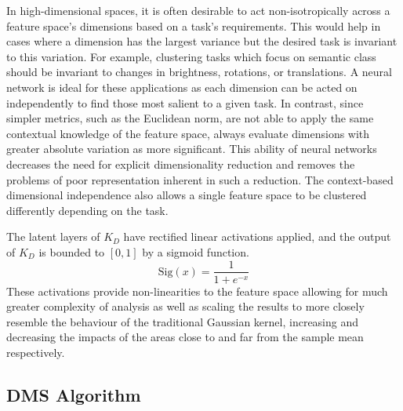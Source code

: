 \documentclass[../thesis.tex]{subfiles}
\begin{document}
In high-dimensional spaces,  it is often desirable to act non-isotropically across a feature space's dimensions based on a task's requirements. This would help in cases where a dimension has the largest variance but the desired task is invariant to this variation. For example, clustering tasks which focus on semantic class should be invariant to changes in brightness, rotations, or translations. 
A neural network is ideal for these applications as each dimension can be acted on independently to find those most salient to a given task. 
In contrast, since simpler metrics, such as the Euclidean norm, are not able to apply the same contextual knowledge of the feature space, always evaluate dimensions with greater absolute variation as more significant.
This ability of neural networks decreases the need for explicit dimensionality reduction and removes the problems of poor representation inherent in such a reduction.
The context-based dimensional independence also allows a single feature space to be clustered differently depending on the task.



The latent layers of $K_D$ have rectified linear activations applied, and the output of $K_D$ is bounded to $[0,1]$ by a sigmoid function.
\begin{equation}
    \mathrm{Sig}(x)= \frac {1}{1+e^{-x}}
\end{equation}
These activations provide non-linearities to the feature space allowing for much greater complexity of analysis as well as scaling the results to more closely resemble the behaviour of the traditional Gaussian kernel, increasing and decreasing the impacts of the areas close to and far from the sample mean respectively.





\subsection{DMS Algorithm}
\end{document}
